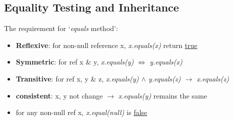 \documentclass[12pt]{article}
\begin{document}
\subsection{Equality Testing and Inheritance}
The requirement for `\emph{equals} method':
\begin{itemize}
    \item \textbf{Reflexive}: for non-null reference x, \emph{x.equals(x)} return \underline{true}
    \item \textbf{Symmetric}: for ref x \& y, \emph{x.equals(y) $\Leftrightarrow$ y.equals(x)}
    \item \textbf{Transitive}: for ref x, y \& z, \emph{x.equals(y) $\land$ y.equals(z) $\rightarrow$ x.equals(z)}
    \item \textbf{consistent}: x, y not change $\rightarrow$ \emph{x.equals(y)} remains the same
    \item for any non-null ref x, \emph{x.equal(null)} is \underline{false}
\end{itemize}
\end{document}
